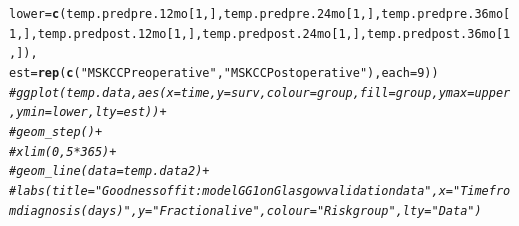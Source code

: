 \documentclass{article}\usepackage[]{graphicx}\usepackage[]{color}
\makeatletter
\newcommand{\hlnum}[1]{\textcolor[rgb]{0.686,0.059,0.569}{#1}}%
\newcommand{\hlstr}[1]{\textcolor[rgb]{0.192,0.494,0.8}{#1}}%
\newcommand{\hlcom}[1]{\textcolor[rgb]{0.678,0.584,0.686}{\textit{#1}}}%
\newcommand{\hlstd}[1]{\textcolor[rgb]{0.345,0.345,0.345}{#1}}%
\newcommand{\hlkwc}[1]{\textcolor[rgb]{0.333,0.667,0.333}{#1}}%
\newcommand{\hlkwd}[1]{\textcolor[rgb]{0.737,0.353,0.396}{\textbf{#1}}}%
\newenvironment{kframe}{%
 \def\at@end@of@kframe{}%
 \ifinner\ifhmode%
  \def\at@end@of@kframe{\end{minipage}}%
  \begin{minipage}{\columnwidth}%
 \fi\fi%
 \def\FrameCommand##1{\hskip\@totalleftmargin \hskip-\fboxsep
 \colorbox{shadecolor}{##1}\hskip-\fboxsep
     \hskip-\linewidth \hskip-\@totalleftmargin \hskip\columnwidth}%
 \MakeFramed {\advance\hsize-\width
   \@totalleftmargin\z@ \linewidth\hsize
   \@setminipage}}%
 {\par\unskip\endMakeFramed%
 \at@end@of@kframe}
\newenvironment{knitrout}{}{} %
\makeatother
\begin{document}
\begin{knitrout}
\begin{kframe}
\begin{alltt}
        \hlkwc{lower} \hlstd{=} \hlkwd{c}\hlstd{(temp.predpre.12mo[}\hlnum{1}\hlstd{,], temp.predpre.24mo[}\hlnum{1}\hlstd{,], temp.predpre.36mo[}\hlnum{1}\hlstd{,], temp.predpost.12mo[}\hlnum{1}\hlstd{,], temp.predpost.24mo[}\hlnum{1}\hlstd{,], temp.predpost.36mo[}\hlnum{1}\hlstd{,]),}
        \hlkwc{est} \hlstd{=} \hlkwd{rep}\hlstd{(}\hlkwd{c}\hlstd{(}\hlstr{"MSKCC Preoperative"}\hlstd{,} \hlstr{"MSKCC Postoperative"}\hlstd{),} \hlkwc{each} \hlstd{=} \hlnum{9}\hlstd{))}
\hlcom{# ggplot(temp.data, aes(x = time, y = surv, colour = group, fill = group, ymax = upper, ymin = lower, lty = est)) + }
\hlcom{# 	geom_step() + }
\hlcom{# 	xlim(0, 5*365) + }
\hlcom{# 	geom_line(data = temp.data2) + }
\hlcom{# 	labs(title = "Goodness of fit: model GG1 on Glasgow validation data", x = "Time from diagnosis (days)", y = "Fraction alive", colour = "Risk group", lty = "Data")}


\end{alltt}
\end{kframe}
\end{knitrout}
\end{document}
